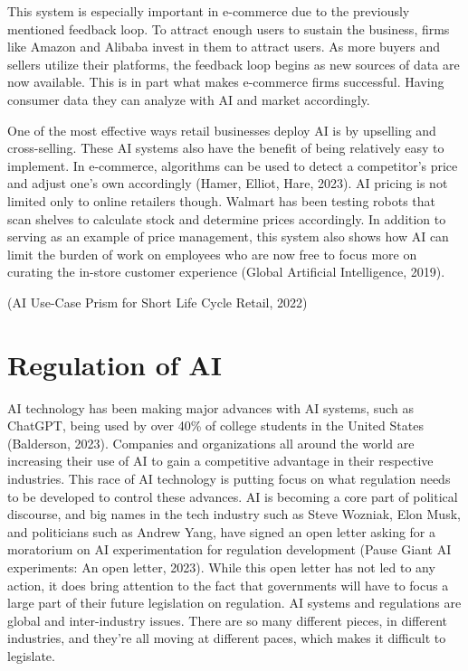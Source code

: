 \documentclass[
]{book}
\begin{document}
This system is especially important in e-commerce due to the previously mentioned feedback loop. To attract enough users to sustain the business, firms like Amazon and Alibaba invest in them to attract users. As more buyers and sellers utilize their platforms, the feedback loop begins as new sources of data are now available. This is in part what makes e-commerce firms successful. Having consumer data they can analyze with AI and market accordingly.

One of the most effective ways retail businesses deploy AI is by upselling and cross-selling. These AI systems also have the benefit of being relatively easy to implement. In e-commerce, algorithms can be used to detect a competitor's price and adjust one's own accordingly (Hamer, Elliot, Hare, 2023). AI pricing is not limited only to online retailers though. Walmart has been testing robots that scan shelves to calculate stock and determine prices accordingly. In addition to serving as an example of price management, this system also shows how AI can limit the burden of work on employees who are now free to focus more on curating the in-store customer experience (Global Artificial Intelligence, 2019).

(AI Use-Case Prism for Short Life Cycle Retail, 2022)

\hypertarget{regulation-of-ai}{%
\chapter{Regulation of AI}\label{regulation-of-ai}}

AI technology has been making major advances with AI systems, such as ChatGPT, being used by over 40\% of college students in the United States (Balderson, 2023). Companies and organizations all around the world are increasing their use of AI to gain a competitive advantage in their respective industries. This race of AI technology is putting focus on what regulation needs to be developed to control these advances. AI is becoming a core part of political discourse, and big names in the tech industry such as Steve Wozniak, Elon Musk, and politicians such as Andrew Yang, have signed an open letter asking for a moratorium on AI experimentation for regulation development (Pause Giant AI experiments: An open letter, 2023). While this open letter has not led to any action, it does bring attention to the fact that governments will have to focus a large part of their future legislation on regulation. AI systems and regulations are global and inter-industry issues. There are so many different pieces, in different industries, and they're all moving at different paces, which makes it difficult to legislate.
\end{document}
